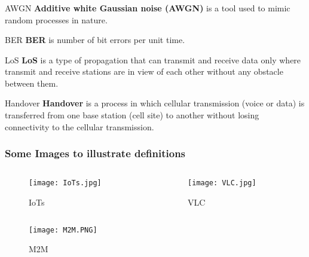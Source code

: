 \documentclass{beamer}
\begin{document}
\begin{frame}
  \frametitle{}
  \begin{block}{AWGN}
  \textbf{Additive white Gaussian noise (AWGN)} is a tool used to mimic random processes in nature.
  \end{block}
  \begin{block}{BER}
  \textbf{BER} is number of bit errors per unit time.
  \end{block}
  \begin{block}{LoS}
  \textbf{LoS} is a type of propagation that can transmit and receive data only where transmit and receive stations are in view of each other without any obstacle between them.
  \end{block}
  \begin{block}{Handover}
  \textbf{Handover} is a process in which cellular transmission (voice or data) is transferred from one base station (cell site) to another without losing connectivity to the cellular transmission.
  \end{block}
\end{frame}

\begin{frame}
  \frametitle{Some Images to illustrate definitions}
  \begin{columns}
	\begin{column}{0.48\textwidth}
		\begin{figure} [h]
    \texttt{[image: IoTs.jpg]}
     \caption{IoTs}
        \end{figure}
	\end{column}
	\begin{column}{0.48\textwidth}
	\begin{figure} [h]
    \texttt{[image: VLC.jpg]}
    \caption{VLC}
    \end{figure}	
	\end{column}
\end{columns}
    \begin{figure} [h]
        \texttt{[image: M2M.PNG]}
        \caption{M2M}
    \end{figure}
\end{frame}
\end{document}
